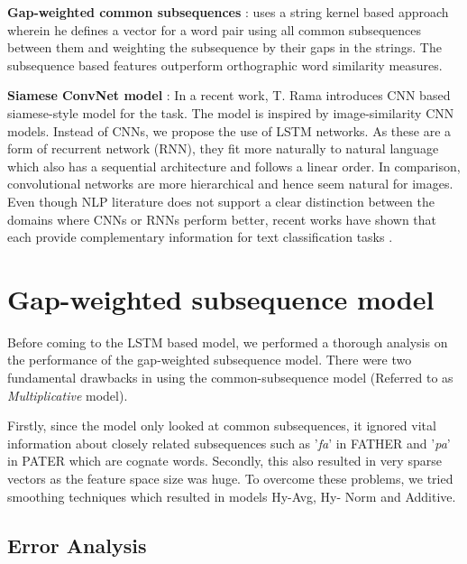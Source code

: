\documentclass[11pt,letterpaper]{article}
\begin{document}
\textbf{Gap-weighted common subsequences} : \citet{rama2015automatic} uses a string kernel based approach wherein he defines a vector for a word pair using all common subsequences between them and weighting the subsequence by their gaps in the strings. The subsequence based features outperform orthographic word similarity measures.

\textbf{Siamese ConvNet model} : In a recent work, T. Rama introduces CNN based siamese-style model \cite{rama2016siamese} for the task. The model is inspired by image-similarity CNN models. Instead of CNNs, we propose the use of LSTM networks. As these are a form of recurrent network (RNN), they fit more naturally to natural language which also has a sequential architecture and follows a linear order. In comparison, convolutional networks are more hierarchical and hence seem natural for images. Even though NLP literature does not support a clear distinction between the domains where CNNs or RNNs perform better, recent works have shown that each provide complementary information for text classification tasks \citep{yin2017comparative}. 



\section{Gap-weighted subsequence model}
Before coming to the LSTM based model, we performed a thorough analysis on the performance of the gap-weighted subsequence model.
There were two fundamental drawbacks in using the common-subsequence model (Referred to as \textit{Multiplicative} model). 

Firstly, since the model only looked at common subsequences, it ignored vital information about closely related subsequences such as ’\textit{fa}’ in FATHER and ’\textit{pa}’ in PATER which are cognate words. 
Secondly, this also resulted in very sparse vectors as the feature space size was huge. To overcome these problems, we tried smoothing techniques which resulted in models Hy-Avg, Hy- Norm and Additive.

\subsection{Error Analysis}
\end{document}
